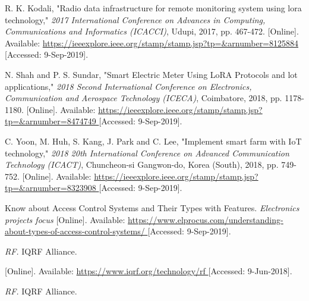 \begin{thebibliography}{9}
R. K. Kodali, "Radio data infrastructure for remote monitoring system using lora technology," \textit{2017 International Conference on Advances in Computing, Communications and Informatics (ICACCI)}, Udupi, 2017, pp. 467-472.
[Online]. Available:
\url{
https://ieeexplore.ieee.org/stamp/stamp.jsp?tp=&arnumber=8125884
}
[Accessed: 9-Sep-2019].


N. Shah and P. S. Sundar, "Smart Electric Meter Using LoRA Protocols and lot applications," \textit{2018 Second International Conference on Electronics, Communication and Aerospace Technology (ICECA)}, Coimbatore, 2018, pp. 1178-1180.
[Online]. Available:
\url{
https://ieeexplore.ieee.org/stamp/stamp.jsp?tp=&arnumber=8474749
}
[Accessed: 9-Sep-2019].



C. Yoon, M. Huh, S. Kang, J. Park and C. Lee, "Implement smart farm with IoT technology," \textit{2018 20th International Conference on Advanced Communication Technology (ICACT)}, Chuncheon-si Gangwon-do, Korea (South), 2018, pp. 749-752.
[Online]. Available:
\url{
https://ieeexplore.ieee.org/stamp/stamp.jsp?tp=&arnumber=8323908
}
[Accessed: 9-Sep-2019].





Know about Access Control Systems and Their Types with Features. \textit{Electronics projects focus}
[Online]. Available:
\url{
https://www.elprocus.com/understanding-about-types-of-access-control-systems/
}
[Accessed: 9-Sep-2019].






\textit{
RF.
}
IQRF Alliance.

[Online]. Available:
\url{
https://www.iqrf.org/technology/rf
}
[Accessed: 9-Jun-2018].



\textit{
RF.
}
IQRF Alliance.


\end{thebibliography}
